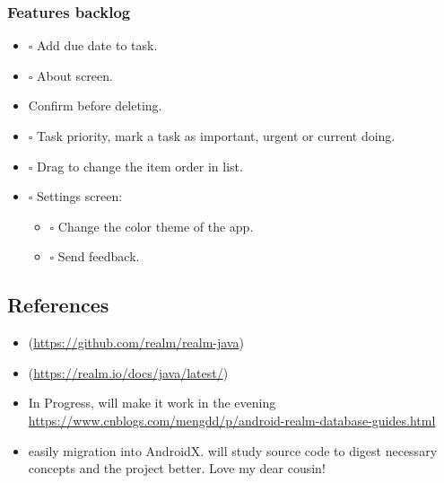\documentclass[9pt, b5paper]{article}
\begin{document}
\subsubsection{Features backlog}
\label{sec-1-1-2}
\begin{itemize}
\item $\square$ Add due date to task.
\item $\square$ About screen.
\item Confirm before deleting.
\item $\square$ Task priority, mark a task as important, urgent or current doing.
\item $\square$ Drag to change the item order in list.
\item $\square$ Settings screen:
\begin{itemize}
\item $\square$ Change the color theme of the app.
\item $\square$ Send feedback.
\end{itemize}
\end{itemize}

\subsection{References}
\label{sec-1-2}
\begin{itemize}
\item{}(\url{https://github.com/realm/realm-java})
\item{}(\url{https://realm.io/docs/java/latest/})
\item In Progress, will make it work in the evening \url{https://www.cnblogs.com/mengdd/p/android-realm-database-guides.html}
\item easily migration into AndroidX. will study source code to digest necessary concepts and the project better. Love my dear cousin!
\end{itemize}
\end{document}
